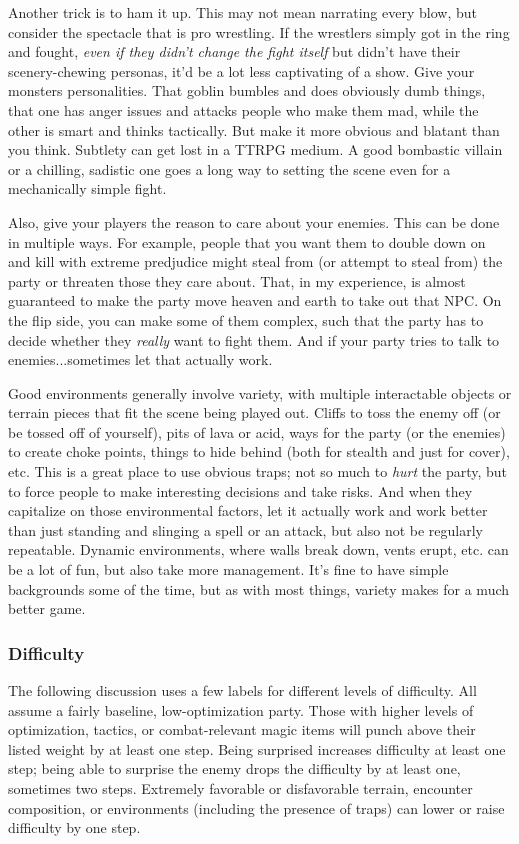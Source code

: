 \documentclass[10pt,twoside,openany,bg=none]{dndbook}
\begin{document}
Another trick is to ham it up. This may not mean narrating every blow, but consider the spectacle that is pro wrestling. If the wrestlers simply got in the ring and fought, \textit{even if they didn't change the fight itself} but didn't have their scenery-chewing personas, it'd be a lot less captivating of a show. Give your monsters personalities. That goblin bumbles and does obviously dumb things, that one has anger issues and attacks people who make them mad, while the other is smart and thinks tactically. But make it more obvious and blatant than you think. Subtlety can get lost in a TTRPG medium. A good bombastic villain or a chilling, sadistic one goes a long way to setting the scene even for a mechanically simple fight.

Also, give your players the reason to care about your enemies. This can be done in multiple ways. For example, people that you want them to double down on and kill with extreme predjudice might steal from (or attempt to steal from) the party or threaten those they care about. That, in my experience, is almost guaranteed to make the party move heaven and earth to take out that NPC. On the flip side, you can make some of them complex, such that the party has to decide whether they \textit{really} want to fight them. And if your party tries to talk to enemies...sometimes let that actually work.

Good environments generally involve variety, with multiple interactable objects or terrain pieces that fit the scene being played out. Cliffs to toss the enemy off (or be tossed off of yourself), pits of lava or acid, ways for the party (or the enemies) to create choke points, things to hide behind (both for stealth and just for cover), etc. This is a great place to use obvious traps; not so much to \textit{hurt} the party, but to force people to make interesting decisions and take risks. And when they capitalize on those environmental factors, let it actually work and work better than just standing and slinging a spell or an attack, but also not be regularly repeatable. Dynamic environments, where walls break down, vents erupt, etc. can be a lot of fun, but also take more management. It's fine to have simple backgrounds some of the time, but as with most things, variety makes for a much better game.

\subsubsection{Difficulty}
The following discussion uses a few labels for different levels of difficulty. All assume a fairly baseline, low-optimization party. Those with higher levels of optimization, tactics, or combat-relevant magic items will punch above their listed weight by at least one step. Being surprised increases difficulty at least one step; being able to surprise the enemy drops the difficulty by at least one, sometimes two steps. Extremely favorable or disfavorable terrain, encounter composition, or environments (including the presence of traps) can lower or raise difficulty by one step.
\end{document}
